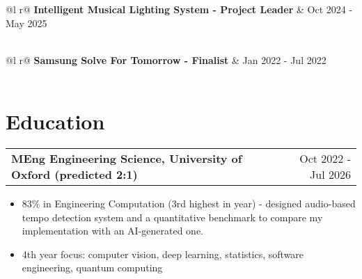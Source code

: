 \documentclass[a4paper,10pt]{article}
\makeatletter
\newenvironment{joblong}[2]
    {
    \begin{tabularx}{\linewidth}{@{}l X r@{}}
    \textbf{#1} & \hfill &  #2 \\[2pt]
    \end{tabularx}
    \begin{minipage}[t]{\linewidth}
    \begin{itemize}[nosep,after=\strut, leftmargin=1em, itemsep=1pt,label=--]
    }
    {
    \end{itemize}
    \end{minipage}    
    }
\makeatother
\begin{document}
\begin{tabularx}{\linewidth}{ @{}l r@{} }
\textbf{Intelligent Musical Lighting System - Project Leader} & \hfill Oct 2024 - May 2025 \\[2pt]
  \\
\end{tabularx}

\vspace{1pt}

\begin{tabularx}{\linewidth}{ @{}l r@{} }
\textbf{Samsung Solve For Tomorrow - Finalist} & \hfill Jan 2022 - Jul 2022 \\[2pt]
  \\
\end{tabularx}

\vspace{12pt}

\section{Education}

\begin{joblong}{MEng Engineering Science, University of Oxford (predicted 2:1)}{Oct 2022 - Jul 2026}
\item 83\% in Engineering Computation (3rd highest in year) - designed audio-based tempo detection system and a quantitative benchmark to compare my implementation with an AI-generated one.
\item 4th year focus: computer vision, deep learning, statistics, software engineering, quantum computing
\end{joblong}

\vspace{12pt}

\end{document}
